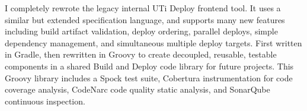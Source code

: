 {
  I completely rewrote the legacy internal UTi Deploy frontend tool. It uses a similar but extended specification language, and supports many new features including build artifact validation, deploy ordering, parallel deploys, simple dependency management, and simultaneous multiple deploy targets. First written in Gradle, then rewritten in Groovy to create decoupled, reusable, testable components in a shared Build and Deploy code library for future projects. This Groovy library includes a Spock test suite, Cobertura instrumentation for code coverage analysis, CodeNarc code quality static analysis, and SonarQube continuous inspection.
}
